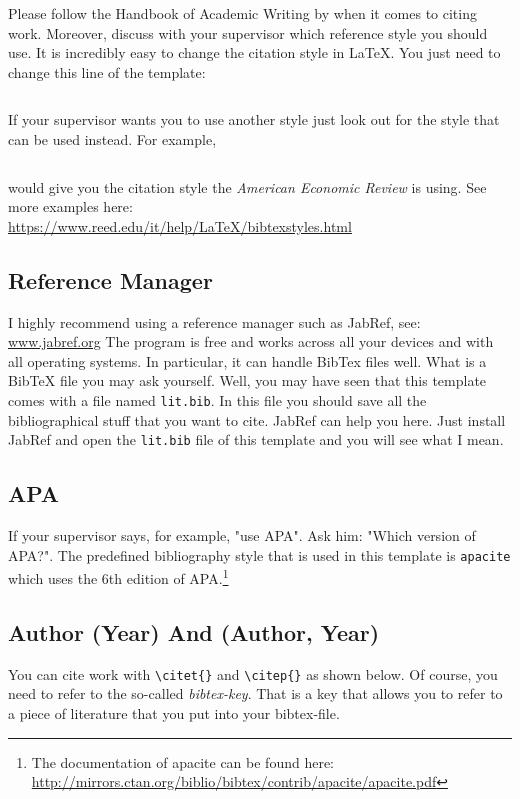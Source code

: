 \documentclass[12pt,final,a4paper,oneside]{book}
\begin{document}
Please follow the Handbook of Academic Writing by  \citet{Hildebrandt2019} when it comes to citing work.
Moreover, discuss with your supervisor which reference style you should use. It is incredibly easy to change the citation style in \LaTeX. You just need to change this line of the template: 
\begin{verbatim}

\end{verbatim}
If your supervisor wants you to use another style just look out for the style that can be used instead. For example, 
\begin{verbatim}

\end{verbatim}
would give you the citation style the \textit{American Economic Review} is using. See more examples here:\\ \url{https://www.reed.edu/it/help/LaTeX/bibtexstyles.html}




	
\subsection{Reference Manager}
	
I highly recommend using a reference manager such as JabRef, see: \url{www.jabref.org} The program is free and works across all your devices and with all operating systems. In particular, it can handle BibTex files well. What is a BibTeX file you may ask yourself. Well, you may have seen that this template comes with a file named \texttt{lit.bib}. In this file you should save all the bibliographical stuff that you want to cite. JabRef can help you here. Just install JabRef and open the \texttt{lit.bib} file of this template and you will see what I mean.
	
\subsection{APA}
	
If your supervisor says, for example, "use APA". Ask him: "Which version of APA?". The predefined bibliography style that is used in this template is \verb*|apacite| which uses the 6th edition of APA.\footnote{The documentation of apacite can be found here: \url{http://mirrors.ctan.org/biblio/bibtex/contrib/apacite/apacite.pdf}}

\subsection{Author (Year) And (Author, Year)}
You can cite work with \verb|\citet{}| and \verb|\citep{}| as shown below. Of course, you need to refer to the so-called \textit{bibtex-key}. That is a key that allows you to refer to a piece of literature that you put into your bibtex-file. 
\end{document}
